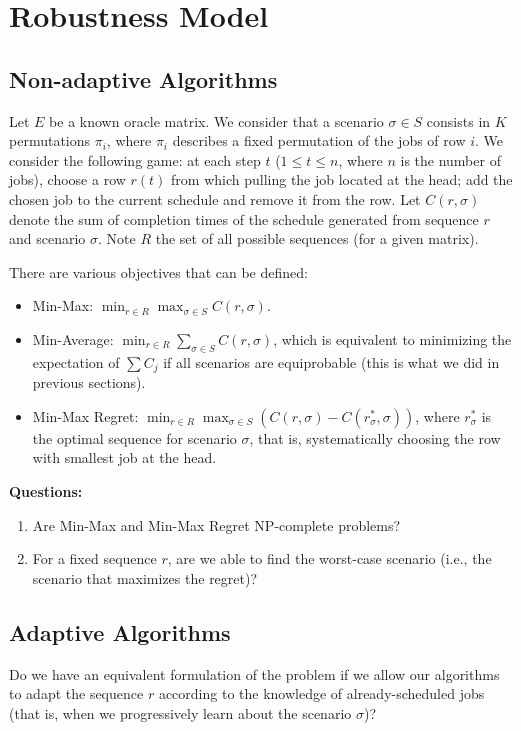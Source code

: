 \documentclass{article}
\begin{document}
\newpage

\section{Robustness Model}

\subsection{Non-adaptive Algorithms}

Let \(E\) be a known oracle matrix.
We consider that a scenario \(\sigma\in S\) consists in \(K\) permutations \(\pi_i\), where \(\pi_i\) describes a fixed permutation of the jobs of row \(i\).
We consider the following game: at each step \(t\) (\(1\le t\le n\), where \(n\) is the number of jobs), choose a row \(r(t)\) from which pulling the job located at the head; add the chosen job to the current schedule and remove it from the row.
Let \(C(r,\sigma)\) denote the sum of completion times of the schedule generated from sequence \(r\) and scenario \(\sigma\).
Note \(R\) the set of all possible sequences (for a given matrix).

There are various objectives that can be defined:
\begin{itemize}
    \item Min-Max: \(\min_{r\in R} \max_{\sigma\in S} C(r,\sigma)\).
    \item Min-Average: \(\min_{r\in R} \sum_{\sigma\in S} C(r,\sigma)\), which is equivalent to minimizing the expectation of \(\sum C_j\) if all scenarios are equiprobable (this is what we did in previous sections).
    \item Min-Max Regret: \(\min_{r\in R}\max_{\sigma\in S} \left(C(r,\sigma)-C(r^*_{\sigma},\sigma)\right)\), where \(r^*_{\sigma}\) is the optimal sequence for scenario \(\sigma\), that is, systematically choosing the row with smallest job at the head.
\end{itemize}

\textbf{Questions:}
\begin{enumerate}
    \item Are Min-Max and Min-Max Regret NP-complete problems?
    \item For a fixed sequence \(r\), are we able to find the worst-case scenario (i.e., the scenario that maximizes the regret)?
\end{enumerate}

\subsection{Adaptive Algorithms}

Do we have an equivalent formulation of the problem if we allow our algorithms to adapt the sequence \(r\) according to the knowledge of already-scheduled jobs (that is, when we progressively learn about the scenario \(\sigma\))?
\end{document}
